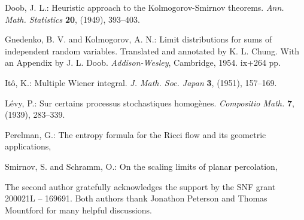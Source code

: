 \documentclass[EJP]{ejpecp} %
\begin{document}
\begin{thebibliography}{99}

%

 Doob, J. L.: Heuristic approach to the Kolmogorov-Smirnov
  theorems. \emph{Ann. Math. Statistics} \textbf{20}, (1949), 393--403.

 Gnedenko, B. V. and Kolmogorov, A. N.: Limit distributions for
  sums of independent random variables. Translated and annotated by K. L.
  Chung. With an Appendix by J. L. Doob. \emph{Addison-Wesley}, Cambridge,
  1954. ix+264 pp. 

 It\^o, K.: Multiple Wiener integral. \emph{J. Math. Soc. Japan}
  \textbf{3}, (1951), 157--169. 

 L\'evy, P.: Sur certains processus stochastiques homog\`enes.
  \emph{Compositio Math.} \textbf{7}, (1939), 283--339. 

 Perelman, G.: The entropy formula for the Ricci flow and its
  geometric applications, 

 Smirnov, S. and Schramm, O.: On the scaling limits of planar
  percolation, 

\end{thebibliography}

\begin{acks}
The second author gratefully acknowledges the support by the SNF grant 200021L -- 169691. Both authors thank Jonathon Peterson and Thomas Mountford for many helpful discussions.
\end{acks}


\end{document}
